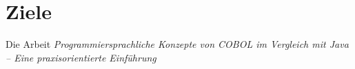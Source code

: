 \section{Ziele}

Die Arbeit \textit{Programmiersprachliche Konzepte von COBOL im Vergleich mit Java -- Eine praxisorientierte Einführung}